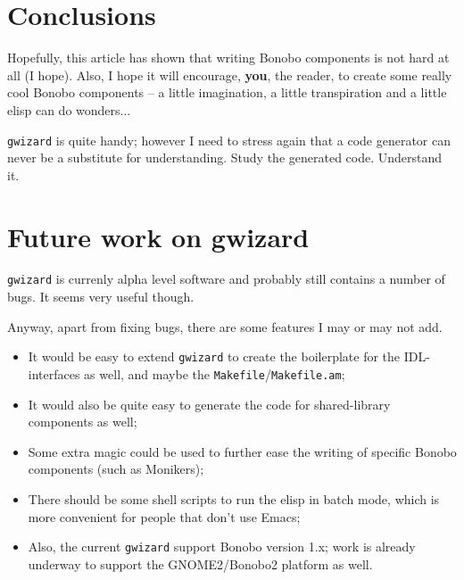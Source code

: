 \documentclass[final,10pt]{article}
\newcommand{\gwizard}{{\tt gwizard}}
\begin{document}
\section{Conclusions}
Hopefully, this article has shown that writing Bonobo components is
not hard at all (I hope). Also, I hope it will encourage, {\bf you}, the reader,
to create some really cool Bonobo components -- a little imagination,
a little transpiration and a little elisp can do wonders...

\gwizard{} is quite handy; however I need to stress again that a
code generator can never be a substitute for understanding. Study the
generated code. Understand it.

\section{Future work on gwizard}
\gwizard{} is currenly alpha level software and probably still
contains a number of bugs. It seems very useful though.

Anyway, apart from fixing bugs, there are some features I may or may not add.
\begin{itemize}
  \item It would be easy to extend \gwizard{} to create the boilerplate for the
  IDL-interfaces as well, and maybe the
  \verb|Makefile|/\verb|Makefile.am|;
  \item It would also be quite easy to generate the code for
  shared-library components as well;
  \item Some extra magic could be used to further ease the writing of
  specific Bonobo components (such as Monikers);
  \item There should be some shell scripts to run the elisp in batch
  mode, which is more convenient for people that don't use Emacs;
  \item Also, the current \gwizard{} support Bonobo version 1.x; work
  is already underway to support the GNOME2/Bonobo2 platform as well.
\end{itemize} 
 \flushleft

\end{document}
